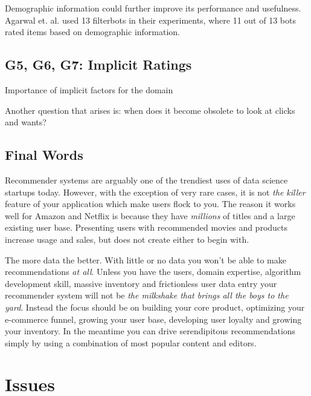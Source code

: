 Demographic information could further improve its performance and usefulness. Agarwal et. al. \cite{Agarwal2009} used 13 filterbots in their experiments, where 11 out of 13 bots rated items based on demographic information.


\subsection{G5, G6, G7: Implicit Ratings}
\label{sec:implicit-discussion}

Importance of implicit factors for the domain

Another question that arises is: when does it become obsolete to look at clicks and wants?

\subsection{Final Words}


Recommender systems are arguably one of the trendiest uses of data science startups today. However, with the exception of very
rare cases, it is not \emph{the killer} feature of your application which make users flock to you. The reason it works
well for Amazon and Netflix is because they have \emph{millions} of titles and a large existing user base. Presenting users
with recommended movies and products increase usage and sales, but does not create either to begin with.

The more data the better. With little or no data you won't be able to make recommendations \emph{at all}. Unless you have the users, domain expertise, algorithm development skill, massive inventory and frictionless user data entry your recommender
system will not be \emph{the milkshake that brings all the boys to the yard}. Instead the focus should be on building your core product, optimizing your e-commerce funnel, growing your user base, developing user loyalty and growing your inventory. In the meantime you can drive serendipitous recommendations simply by using a combination of most popular content and editors.



\section{Issues}\label{sec:issues}

